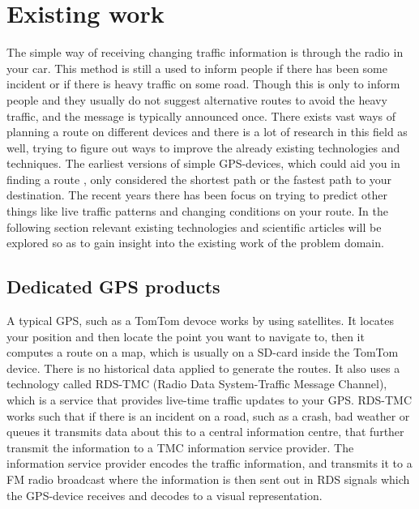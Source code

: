 \section{Existing work}
The simple way of receiving changing traffic information is through the radio in your car. This method is still a used to inform people if there has been some incident or if there is heavy traffic on some road. Though this is only to inform people and they usually do not suggest alternative routes to avoid the heavy traffic, and the message is typically announced once.  
There exists vast ways of planning a route on different devices and there is  a lot of research in this field as well, trying to figure out ways to improve the already existing technologies and techniques. The earliest versions of simple GPS-devices, which could aid you in finding a route , only considered the shortest path or the fastest path to your destination. 
The recent years there has been focus on trying to predict other things like live traffic patterns and changing conditions on your route.
In the following section relevant existing technologies and scientific articles will be explored so as to gain insight into the existing work of the problem domain.
\subsection*{Dedicated GPS products}
A typical GPS, such as a TomTom devoce works by using satellites. It locates your position and then locate the point you want to navigate to, then it computes a route on a map, which is usually on a SD-card inside the TomTom device. There is no historical data applied to generate the routes.
It also uses a technology called RDS-TMC (Radio Data System-Traffic Message Channel), which is a service that provides live-time traffic updates to your GPS. RDS-TMC works such that if there is an incident on a road, such as a crash, bad weather or queues it transmits data about this to a central information centre, that further transmit the information to a TMC information service provider. The information service provider encodes the traffic information, and transmits it to a FM radio broadcast where the information is then sent out in RDS signals which the GPS-device receives and decodes to a visual representation.

